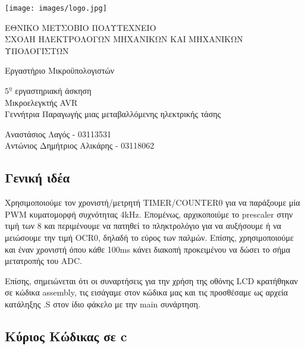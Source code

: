 \documentclass[11pt]{article}
\begin{document}
\begin{titlepage}
    \texttt{[image: images/logo.jpg]}
	\begin{center}
		{ 
			ΕΘΝΙΚΟ ΜΕΤΣΟΒΙΟ ΠΟΛΥΤΕΧΝΕΙΟ\\
			ΣΧΟΛΗ ΗΛΕΚΤΡΟΛΟΓΩΝ ΜΗΧΑΝΙΚΩΝ ΚΑΙ ΜΗΧΑΝΙΚΩΝ ΥΠΟΛΟΓΙΣΤΩΝ
		}
		
		\vfill

		{\Large
			Εργαστήριο Μικροϋπολογιστών
		}
		
		{\large
			$5^η$ εργαστηριακή άσκηση \\ Μικροελεγκτής AVR \\ Γεννήτρια Παραγωγής  μιας μεταβαλλόμενης ηλεκτρικής τάσης
		}

		\vfill

		{
			Αναστάσιος Λαγός - 03113531\\
			Αντώνιος Δημήτριος Αλικάρης - 03118062
		}
	\end{center}
\end{titlepage}


\subsection*{Γενική ιδέα}
Χρησιμοποιούμε τον χρονιστή/μετρητή TIMER/COUNTER0 για να παράξουμε μία PWM κυματομορφή συχνότητας 4kHz. Επομένως, αρχικοποιύμε το prescaler στην τιμή των 8 και περιμένουμε να πατηθεί το πληκτρολόγιο για να αυξήσουμε ή να μειώσουμε την τιμή OCR0, δηλαδή το εύρος των παλμών. Επίσης, χρησιμοποιούμε και έναν χρονιστή όπου κάθε 100ms κάνει διακοπή προκειμένου να δώσει το σήμα μετατροπής  του ADC.

Επίσης, σημειώνεται ότι οι συναρτήσεις για την χρήση της οθόνης LCD κρατήθηκαν σε κώδικα assembly, τις εισάγαμε στον κώδικα μας και τις προσθέσαμε ως αρχεία κατάληξης .S στον ίδιο φάκελο με την main συνάρτηση.

\subsection*{Κύριος Κώδικας σε c}
\end{document}
